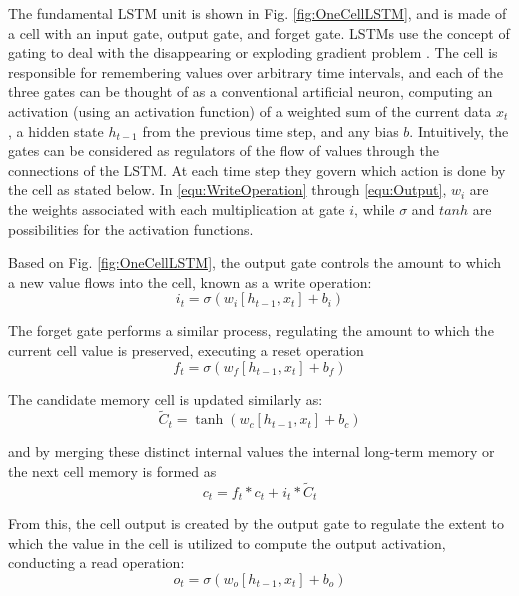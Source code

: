 The fundamental LSTM unit is shown in Fig. \ref{fig:OneCellLSTM}, and is made of a cell with an input gate, output gate, and forget gate. LSTMs use the concept of gating to deal with the disappearing or exploding gradient problem \cite{LSTM2}. The cell is responsible for remembering values over arbitrary time intervals, and each of the three gates can be thought of as a conventional artificial neuron, computing an activation (using an activation function) of a weighted sum of the current data $x_{t}$, a hidden state $h_{t-1}$ from the previous time step, and any bias $b$. Intuitively, the gates can be considered as regulators of the flow of values through the connections of the LSTM. At each time step they govern which action is done by the cell as stated below. In \ref{equ:WriteOperation} through \ref{equ:Output}, $w_{i}$ are the weights associated with each multiplication at gate $i$, while $\sigma$ and $tanh$ are possibilities for the activation functions.

Based on Fig. \ref{fig:OneCellLSTM}, the output gate controls the amount to which a new value flows into the cell, known as a write operation:
\begin{equation}
    \label{equ:WriteOperation}
    i_t=\sigma(w_i[h_{t-1},x_t]+b_i)
\end{equation}

The forget gate performs a similar process, regulating the amount to which the current cell value is preserved, executing a reset operation
\begin{equation}
    \label{equ:ResetOperation}
    f_t=\sigma(w_f[h_{t-1},x_t]+b_f)
\end{equation}

The candidate memory cell is updated similarly as:
\begin{equation}
    \label{equ:NewCandidateValue}
    \tilde{C}_t=\tanh(w_c[h_{t-1},x_t]+b_c)
\end{equation}

and by merging these distinct internal values the internal long-term memory or the next cell memory is formed as
\begin{equation}
    \label{equ:Combination}
    c_t=f_t*c_t+i_t*\tilde{C}_t
\end{equation}

From this, the cell output is created by the output gate to regulate the extent to which the value in the cell is utilized to compute the output activation, conducting a read operation:
\begin{equation}
    \label{equ:ReadOperation}
    o_t=\sigma(w_o[h_{t-1},x_t]+b_o)
\end{equation}

